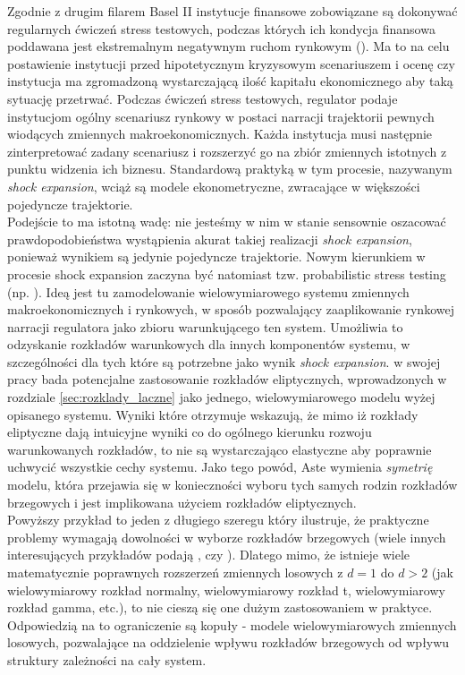 Zgodnie z drugim filarem Basel II instytucje finansowe zobowiązane są dokonywać regularnych ćwiczeń stress testowych, podczas których ich kondycja finansowa poddawana jest ekstremalnym negatywnym ruchom rynkowym (\cite{BaselII}). Ma to na celu postawienie instytucji przed hipotetycznym kryzysowym scenariuszem i ocenę czy instytucja ma zgromadzoną wystarczającą ilość kapitału ekonomicznego aby taką sytuację przetrwać. Podczas ćwiczeń stress testowych, regulator podaje instytucjom ogólny scenariusz rynkowy w postaci narracji trajektorii pewnych wiodących zmiennych makroekonomicznych. Każda instytucja musi następnie zinterpretować zadany scenariusz i rozszerzyć go na zbiór zmiennych istotnych z punktu widzenia ich biznesu. Standardową praktyką w tym procesie, nazywanym \emph{shock expansion}, wciąż są modele ekonometryczne, zwracające w większości pojedyncze trajektorie. \cite{Siddique_Stress_testing}\\
Podejście to ma istotną wadę: nie jesteśmy w nim w stanie sensownie oszacować prawdopodobieństwa wystąpienia akurat takiej realizacji \emph{shock expansion}, ponieważ wynikiem są jedynie pojedyncze trajektorie. Nowym kierunkiem w procesie shock expansion zaczyna być natomiast tzw. probabilistic stress testing (np. \cite{Aste_Probabilistic_Stress_Testing}). Ideą jest tu zamodelowanie wielowymiarowego systemu zmiennych makroekonomicznych i rynkowych, w sposób pozwalający zaaplikowanie rynkowej narracji regulatora jako zbioru warunkującego ten system. Umożliwia to odzyskanie rozkładów warunkowych dla innych komponentów systemu, w szczególności dla tych które są potrzebne jako wynik \emph{shock expansion}. \cite{Aste_Probabilistic_Stress_Testing} w swojej pracy bada potencjalne zastosowanie rozkładów eliptycznych, wprowadzonych w rozdziale \ref{sec:rozklady_laczne} jako jednego, wielowymiarowego modelu wyżej opisanego systemu. Wyniki które otrzymuje wskazują, że mimo iż rozkłady eliptyczne dają intuicyjne wyniki co do ogólnego kierunku rozwoju warunkowanych rozkładów, to nie są wystarczająco elastyczne aby poprawnie uchwycić wszystkie cechy systemu. Jako tego powód, Aste wymienia \textit{symetrię} modelu, która przejawia się w konieczności wyboru tych samych rodzin rozkładów brzegowych i jest implikowana użyciem rozkładów eliptycznych.\\

Powyższy przykład to jeden z długiego szeregu który ilustruje, że praktyczne problemy wymagają dowolności w wyborze rozkładów brzegowych (wiele innych interesujących przykładów podają \cite{Cherubini_Copula_Methods_in_Finance}, czy \cite{Cherubini_Dynamic_Copula_Methods_in_Finance}). Dlatego mimo, że istnieje wiele matematycznie poprawnych rozszerzeń zmiennych losowych z $d=1$ do $d>2$ (jak wielowymiarowy rozkład normalny, wielowymiarowy rozkład t, wielowymiarowy rozkład gamma, etc.), to nie cieszą się one dużym zastosowaniem w praktyce. Odpowiedzią na to ograniczenie są kopuły - modele wielowymiarowych zmiennych losowych, pozwalające na oddzielenie wpływu rozkładów brzegowych od wpływu struktury zależności na cały system.\\